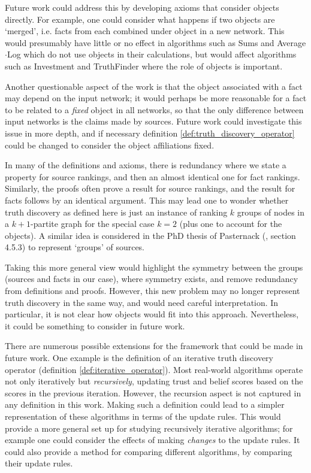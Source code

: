\documentclass[../main.tex]{subfiles}
\begin{document}
Future work could address this by developing axioms that consider objects
directly. For example, one could consider what happens if two objects are
`merged', i.e. facts from each combined under object in a new network. This
would presumably have little or no effect in algorithms such as Sums and
Average$\cdot$Log \cite{pasternack} which do not use objects in their
calculations, but would affect algorithms such as Investment \cite{pasternack}
and TruthFinder \cite{yin_han_yu} where the role of objects is
important.\footnotemark{}


Another questionable aspect of the work is that the object associated with a
fact may depend on the input network; it would perhaps be more reasonable for a
fact to be related to a \emph{fixed} object in all networks, so that the only
difference between input networks is the claims made by sources. Future work
could investigate this issue in more depth, and if necessary definition
\ref{def:truth_discovery_operator} could be changed to consider the object
affiliations fixed.

In many of the definitions and axioms, there is redundancy where we state a
property for source rankings, and then an almost identical one for fact
rankings. Similarly, the proofs often prove a result for source rankings, and
the result for facts follows by an identical argument. This may lead one to
wonder whether truth discovery as defined here is just an instance of ranking
$k$ groups of nodes in a $k + 1$-partite graph for the special case $k = 2$
(plus one to account for the objects). A similar idea is considered in the PhD
thesis of Pasternack (\cite{pasternack_thesis}, section 4.5.3) to represent
`groups' of sources.

Taking this more general view would highlight the symmetry between the groups
(sources and facts in our case), where symmetry exists, and remove redundancy
from definitions and proofs.  However, this new problem may no longer represent
truth discovery in the same way, and would need careful interpretation. In
particular, it is not clear how objects would fit into this approach.
Nevertheless, it could be something to consider in future work.

There are numerous possible extensions for the framework that could be made in
future work. One example is the definition of an iterative truth discovery
operator (definition \ref{def:iterative_operator}). Most real-world algorithms
operate not only iteratively but \emph{recursively}, updating trust and belief
scores based on the scores in the previous iteration. However, the recursion
aspect is not captured in any definition in this work. Making such a definition
could lead to a simpler representation of these algorithms in terms of the
update rules. This would provide a more general set up for studying recursively
iterative algorithms; for example one could consider the effects of making
\emph{changes} to the update rules. It could also provide a method for
comparing different algorithms, by comparing their update rules.
\end{document}
